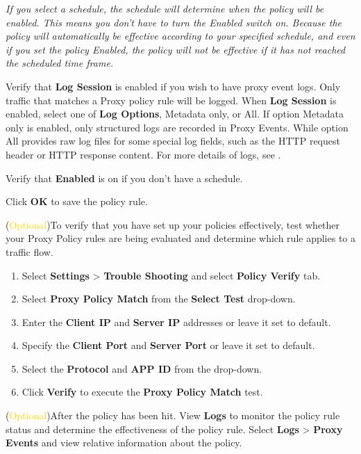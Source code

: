 \begin{description}
    \notemark\textit{If you select a schedule, the schedule will determine when the policy will be enabled. This means you don’t have to turn the Enabled switch on. 
    Because the policy will automatically be effective according to your specified schedule, and even if you set the policy Enabled,  the policy will not be effective if it has not reached the scheduled time frame.}
    \item[STEP 11.]	Verify that \textbf{Log Session} is enabled if you wish to have proxy event logs. Only traffic that matches a Proxy policy rule will be logged. 
    When \textbf{Log Session} is enabled, select one of \textbf{Log Options}, Metadata only, or All. If option Metadata only is enabled, only structured logs are recorded in Proxy Events. 
    While option All provides raw log files for some special log fields, such as the HTTP request header or HTTP response content. For more details of logs, see \textbf{\hyperlink{link:View and Manage Logs}{\color{linkblue}{View and Manage Logs}}}.
    \item[STEP 12.]	Verify that \textbf{Enabled} is on if you don’t have a schedule.
    \item[STEP 13.]	Click \textbf{OK} to save the policy rule.
    \item[STEP 14.]	(\textcolor{gold}{Optional})To verify that you have set up your policies effectively, test whether your Proxy Policy rules are being evaluated and determine which rule applies to a traffic flow. 
    \begin{enumerate}
        \item Select \textbf{Settings} > \textbf{Trouble Shooting} and select \textbf{Policy Verify} tab.
        \item Select \textbf{Proxy Policy Match} from the \textbf{Select Test} drop-down. 
        \item Enter the \textbf{Client IP} and \textbf{Server IP} addresses or leave it set to default.
        \item Specify the \textbf{Client Port} and \textbf{Server Port} or leave it set to default.
        \item Select the \textbf{Protocol} and \textbf{APP ID} from the drop-down. 
        \item Click \textbf{Verify} to execute the \textbf{Proxy Policy Match} test.
    \end{enumerate}
    \item[STEP 15.]	(\textcolor{gold}{Optional})After the policy has been hit. View \textbf{Logs} to monitor the policy rule status and determine the effectiveness of the policy rule. 
    Select \textbf{Logs} > \textbf{Proxy Events} and view relative information about the policy.
\end{description}


